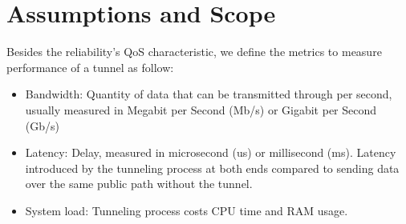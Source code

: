 



\section{Assumptions and Scope}

Besides the reliability's \ac{QoS} characteristic, we define the metrics to measure performance of a tunnel as follow:
\begin{itemize}
    \item Bandwidth: Quantity of data that can be transmitted through per second, usually measured in Megabit per Second (Mb/s) or Gigabit  per Second (Gb/s)
    \item Latency: Delay, measured in microsecond (us) or millisecond (ms). Latency introduced by the tunneling process at both ends compared to sending data over the same public path without the tunnel.
    \item System load: Tunneling process costs CPU time and RAM usage.
\end{itemize}

